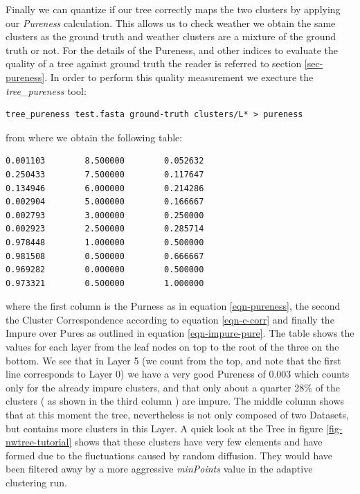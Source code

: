 Finally we can quantize if our tree correctly maps the two
clusters by applying our \emph{Pureness} calculation. This allows us
to check weather we obtain the same clusters as the ground truth and
weather clusters are a mixture of the ground truth or not. For the
details of the Pureness, and other indices to evaluate the quality of
a tree against ground truth the reader is referred to section
\ref{sec-pureness}. In order to perform this quality measurement we
execture the \emph{tree\_pureness} tool:
\begin{lstlisting}
tree_pureness test.fasta ground-truth clusters/L* > pureness
\end{lstlisting}
from where we obtain the following table:
\begin{lstlisting}
0.001103        8.500000        0.052632
0.250433        7.500000        0.117647
0.134946        6.000000        0.214286
0.002904        5.000000        0.166667
0.002793        3.000000        0.250000
0.002923        2.500000        0.285714
0.978448        1.000000        0.500000
0.981508        0.500000        0.666667
0.969282        0.000000        0.500000
0.973321        0.500000        1.000000
\end{lstlisting}
where the first column is the Purness as in equation
\ref{eqn-pureness}, the second the Cluster Correspondence according to
equation \ref{eqn-c-corr} and finally the Impure over Pures as
outlined in equation \ref{eqn-impure-pure}. The table shows the values
for each layer from the leaf nodes on top to the root of the three on
the bottom. We see that in Layer 5 (we count from the top, and note
that the first line corresponds to Layer 0)
we have a very good Pureness of 0.003 which counts only for the
already impure clusters, and that only about a quarter 28\% of the
clusters ( as shown in the third column ) are impure. The middle
column shows that at this moment the tree, nevertheless is not only
composed of two Datasets, but contains more clusters in this Layer. A
quick look at the Tree in figure \ref{fig-nwtree-tutorial} shows that
these clusters have very few elements and have formed due to the
fluctuations caused by random diffusion. They would have been filtered
away by a more aggressive \emph{minPoints} value in the adaptive
clustering run.





